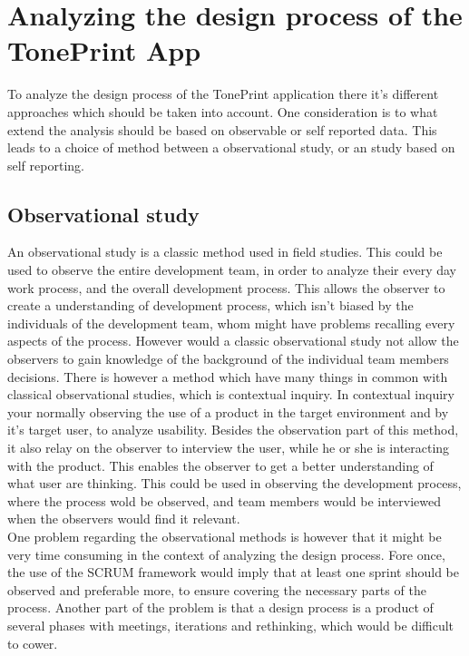 \section{Analyzing the design process of the TonePrint App}
\label{AnalyzingTonePrintDesign}
To analyze the design process of the TonePrint application there it's different approaches which should be taken into account. One consideration is to what extend the analysis should be based on observable or self reported data. This leads to a choice of method between a observational study, or an study based on self reporting. 


\subsection*{Observational study}
\label{MethodObservation}
An observational study is a classic method used in field studies. This could be used to observe the entire development team, in order to analyze their every day work process, and the overall development process. This allows the observer to create a understanding of development process, which isn't biased by the individuals of the development team, whom might have problems recalling every aspects of the process. However would a classic observational study not allow the observers to gain knowledge of the background of the individual team members decisions. There is however a method which have many things in common with classical observational studies, which is contextual inquiry. In contextual inquiry your normally observing the use of a product in the target environment and by it's target user, to analyze usability. Besides the observation part of this method, it also relay on the observer to interview the user, while he or she is interacting with the product. This enables the observer to get a better understanding of what user are thinking. This could be used in observing the development process, where the process wold be observed, and team members would be interviewed when the observers would find it relevant. \\
One problem regarding the observational methods is however that it might be very time consuming in the context of analyzing the design process. Fore once, the use of the SCRUM framework would imply that at least one sprint should be observed and preferable more, to ensure covering the necessary parts of the process. Another part of the problem is that a design process is a product of several phases with meetings, iterations and rethinking, which would be difficult to cower.


